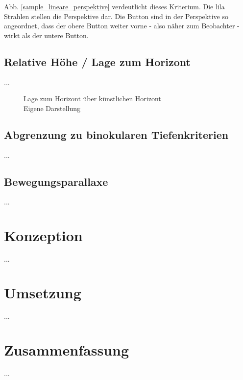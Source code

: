 Abb. \ref{sample_lineare_perspektive} verdeutlicht dieses Kriterium. Die lila Strahlen stellen die Perspektive dar. Die Button sind in der Perspektive so angeordnet, dass der obere Button weiter vorne - also näher zum Beobachter - wirkt als der untere Button.

\subsection{Relative Höhe / Lage zum Horizont}
...

\begin{figure}[!ht]
\centering
{}
\caption[Lage zum Horizont über künstlichen Horizont]{Lage zum Horizont über künstlichen Horizont\\ Eigene Darstellung}
\label{sample_lage_zum_horizont}
\end{figure}

\subsection{Abgrenzung zu binokularen Tiefenkriterien}
...

\subsection{Bewegungsparallaxe}
...

\section{Konzeption}
...

\section{Umsetzung}
...

\section{Zusammenfassung}
...